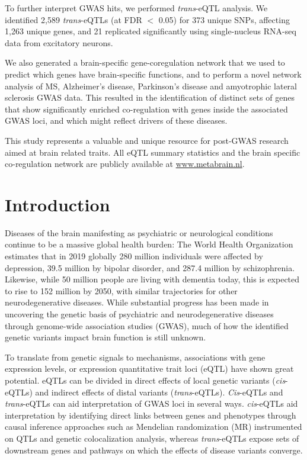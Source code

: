 To further interpret GWAS hits, we performed \textit{trans}-eQTL analysis. We identified 2,589 \textit{trans}-eQTLs (at FDR $<$ 0.05) for 373 unique SNPs, affecting 1,263 unique genes, and 21 replicated significantly using single-nucleus RNA-seq data from excitatory neurons.  

We also generated a brain-specific gene-coregulation network that we used to predict which genes have brain-specific functions, and to perform a novel network analysis of MS, Alzheimer’s disease, Parkinson’s disease and amyotrophic lateral sclerosis GWAS data. This resulted in the identification of distinct sets of genes that show significantly enriched co-regulation with genes inside the associated GWAS loci, and which might reflect drivers of these diseases. 

This study represents a valuable and unique resource for post-GWAS research aimed at brain related traits. All eQTL summary statistics and the brain specific co-regulation network are publicly available at \url{www.metabrain.nl}. 

\section{Introduction}
Diseases of the brain manifesting as psychiatric or neurological conditions continue to be a massive global health burden: The World Health Organization estimates that in 2019 globally 280 million individuals were affected by depression, 39.5 million by bipolar disorder, and 287.4 million by schizophrenia\cite{vosGlobalBurden3692020}. Likewise, while 50 million people are living with dementia today, this is expected to rise to 152 million by 2050\cite{WorldAlzheimerReport2018}, with similar trajectories for other neurodegenerative diseases. While substantial progress has been made in uncovering the genetic basis of psychiatric and neurodegenerative diseases through genome-wide association studies (GWAS), much of how the identified genetic variants impact brain function is still unknown.

To translate from genetic signals to mechanisms, associations with gene expression levels, or expression quantitative trait loci (eQTL) have shown great potential. eQTLs can be divided in direct effects of local genetic variants (\textit{cis}-eQTLs) and indirect effects of distal variants (\textit{trans}-eQTLs). \textit{Cis}-eQTLs and \textit{trans}-eQTLs can aid interpretation of GWAS loci in several ways. \textit{cis}-eQTLs aid interpretation by identifying direct links between genes and phenotypes through causal inference approaches such as Mendelian randomization (MR) instrumented on QTLs and genetic colocalization analysis, whereas \textit{trans}-eQTLs expose sets of downstream genes and pathways on which the effects of disease variants converge.  

